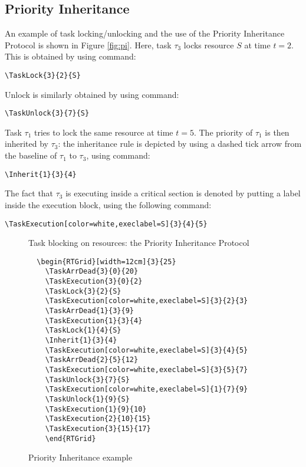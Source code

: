 \documentclass{article}
\begin{document}
\subsection{Priority Inheritance}

An example of task locking/unlocking and the use of the Priority
Inheritance Protocol is shown in Figure \ref{fig:pi}. Here, task
$\tau_3$ locks resource $S$ at time $t=2$. This is obtained by using
command:
\begin{verbatim}
\TaskLock{3}{2}{S}
\end{verbatim}
Unlock is similarly obtained by using command: 
\begin{verbatim}
\TaskUnlock{3}{7}{S}
\end{verbatim}

Task $\tau_1$ tries to lock the same resource at time $t=5$. The
priority of $\tau_1$ is then inherited by $\tau_3$: the inheritance
rule is depicted by using a dashed tick arrow from the baseline of
$\tau_1$ to $\tau_3$, using command:
\begin{verbatim}
\Inherit{1}{3}{4}
\end{verbatim}
The fact that $\tau_3$ is executing inside a critical section is
denoted by putting a label inside the execution block, using the
following command:
\begin{verbatim}
\TaskExecution[color=white,execlabel=S]{3}{4}{5}
\end{verbatim}

\begin{figure}
  \centering
  \begin{RTGrid}[width=12cm]{3}{25}
  \end{RTGrid}
  \caption{Task blocking on resources: the Priority Inheritance Protocol}
  \label{fig:pi}
\begin{verbatim}
  \begin{RTGrid}[width=12cm]{3}{25}
    \TaskArrDead{3}{0}{20}
    \TaskExecution{3}{0}{2}
    \TaskLock{3}{2}{S}
    \TaskExecution[color=white,execlabel=S]{3}{2}{3}
    \TaskArrDead{1}{3}{9}  
    \TaskExecution{1}{3}{4}
    \TaskLock{1}{4}{S}
    \Inherit{1}{3}{4}
    \TaskExecution[color=white,execlabel=S]{3}{4}{5}
    \TaskArrDead{2}{5}{12}
    \TaskExecution[color=white,execlabel=S]{3}{5}{7}
    \TaskUnlock{3}{7}{S}
    \TaskExecution[color=white,execlabel=S]{1}{7}{9}
    \TaskUnlock{1}{9}{S}
    \TaskExecution{1}{9}{10}
    \TaskExecution{2}{10}{15}
    \TaskExecution{3}{15}{17}
    \end{RTGrid}
\end{verbatim}
  \caption{Priority Inheritance example}
  \label{fig:ex4}
\end{figure}
\end{document}
